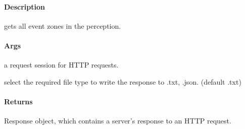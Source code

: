 \documentclass[letterpaper,10pt,english]{sphinxmanual}
\begin{document}
\begin{fulllineitems}
\label{\detokenize{gemini_event_zone_API:gemini_event_zone_API.get_event_zone_all_zones}}
\pysigstartsignatures
{}
\pysigstopsignatures

\paragraph{Description}
\label{\detokenize{gemini_event_zone_API:id5}}
\sphinxAtStartPar
gets all event zones in the perception.


\paragraph{Args}
\label{\detokenize{gemini_event_zone_API:id6}}\begin{description}
\sphinxAtStartPar
a request session for HTTP requests.

\sphinxAtStartPar
select the required file type to write the response to .txt, .json. (default .txt)

\end{description}


\paragraph{Returns}
\label{\detokenize{gemini_event_zone_API:id7}}\begin{description}
\sphinxAtStartPar
Response object, which contains a server’s response to an HTTP request.

\end{description}

\end{fulllineitems}

\end{document}

